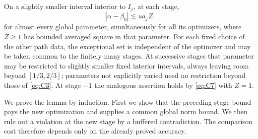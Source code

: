 \begin{lemma}\label{bud:strengthening}
On a slightly smaller interval interior to \(I_j\), at each stage,
\[
 |\alpha-\beta_0|\lesssim u a_j Z                                                   \tag{C12}\label{eq:C12}
\]
for almost every global parameter, simultaneously for all its optimizers, where \(Z\ge1\) has bounded averaged square in that parameter. For each fixed choice of the other path data, the exceptional set is independent of the optimizer and may be taken common to the finitely many stages. At successive stages that parameter may be restricted to slightly smaller fixed interior intervals, always leaving room beyond \([1/3,2/3]\); parameters not explicitly varied need no restriction beyond those of \eqref{eq:C3}. At stage \(-1\) the analogous assertion holds by \eqref{eq:C7} with \(Z=1\).

\end{lemma}

We prove the lemma by induction.  First we show that the preceding-stage
bound pays the new optimization and supplies a common global norm bound.
We then rule out a violation at the new stage by a buffered contradiction.
The comparison cost therefore depends only on the already proved accuracy.



